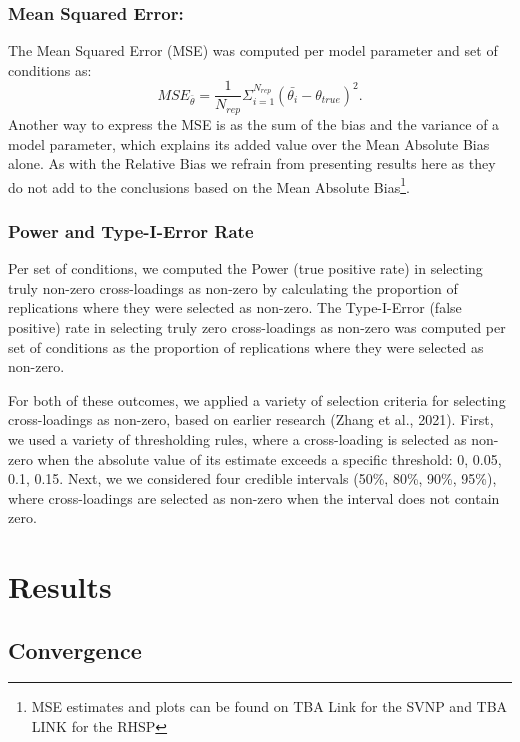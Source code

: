 \documentclass[
  man, donotrepeattitle,floatsintext]{apa6}
\begin{document}
\hypertarget{mean-squared-error}{%
\subsubsection{Mean Squared Error:}\label{mean-squared-error}}

The Mean Squared Error (MSE) was computed per model parameter and set of conditions as:
\[MSE_{\bar{\theta}} = \frac{1}{N_{rep}} \Sigma_{i = 1}^{N_{rep}} (\bar{\theta_i} - \theta_{true})^2.\]
Another way to express the MSE is as the sum of the bias and the variance of a model parameter, which explains its added value over the Mean Absolute Bias alone. As with the Relative Bias we refrain from presenting results here as they do not add to the conclusions based on the Mean Absolute Bias\footnote{MSE estimates and plots can be found on TBA Link for the SVNP and TBA LINK for the RHSP}.

\hypertarget{power-and-type-i-error-rate}{%
\subsubsection{Power and Type-I-Error Rate}\label{power-and-type-i-error-rate}}

Per set of conditions, we computed the Power (true positive rate) in selecting truly non-zero cross-loadings as non-zero by calculating the proportion of replications where they were selected as non-zero. The Type-I-Error (false positive) rate in selecting truly zero cross-loadings as non-zero was computed per set of conditions as the proportion of replications where they were selected as non-zero.

For both of these outcomes, we applied a variety of selection criteria for selecting cross-loadings as non-zero, based on earlier research (Zhang et al., 2021). First, we used a variety of thresholding rules, where a cross-loading is selected as non-zero when the absolute value of its estimate exceeds a specific threshold: 0, 0.05, 0.1, 0.15. Next, we we considered four credible intervals (50\%, 80\%, 90\%, 95\%), where cross-loadings are selected as non-zero when the interval does not contain zero.

\hypertarget{results}{%
\section{Results}\label{results}}

\hypertarget{convergence}{%
\subsection{Convergence}\label{convergence}}
\end{document}
